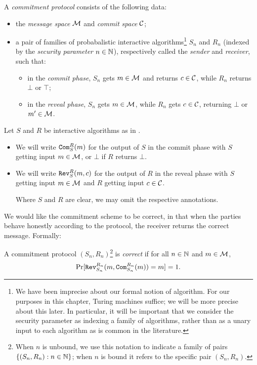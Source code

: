 \begin{dfn}\label{def:commitment protocol}
	A \emph{commitment protocol} consists of the following data:
	\begin{itemize}
		\item the \emph{message space} $\mathcal{M}$ and \emph{commit space} $\mathcal{C}$;
		\item a pair of families of probabalistic interactive algorithms\footnote{We
			      have been imprecise about our formal notion of algorithm. For our
			      purposes in this chapter, Turing machines suffice; we will be more
			      precise about this later. In particular, it will be important that we
			      consider the security parameter as indexing a family of algorithms, rather
			      than as a unary input to each algorithm as is common in the literature.}
		      $S_n$ and $R_n$ (indexed by the
		      \emph{security parameter} $n\in\mathbb{N}$), respectively called the \emph{sender}
		      and \emph{receiver}, such that:
		      \begin{itemize}
			      \item in the \emph{commit phase}, $S_n$ gets $m\in\mathcal{M}$ and returns
			            $c\in\mathcal{C}$, while $R_n$ returns $\bot$ or $\top$;
			      \item in the \emph{reveal phase}, $S_n$ gets $m\in\mathcal{M}$, while $R_n$
			            gets $c\in\mathcal{C}$, returning $\bot$ or $m'\in\mathcal{M}$.
		      \end{itemize}
	\end{itemize}
\end{dfn}

\begin{ntn}
	Let $S$ and $R$ be interactive algorithms as in .\begin{itemize}
		\item	We will write ${\texttt{Com}}_S^R(m)$ for the output of $S$
		      in the commit phase with $S$ getting input $m\in\mathcal{M}$, or $\bot$ if $R$
		      returns $\bot$.
		\item We will write ${\texttt{Rev}}_S^R(m, c)$
		      for the output of $R$ in the reveal phase with $S$ getting input
		      $m\in\mathcal{M}$ and $R$ getting input $c\in\mathcal{C}$.

		      Where $S$ and $R$ are clear, we may omit the respective annotations.
	\end{itemize}
\end{ntn}

\noindent
We would like the commitment scheme to be correct, in that when the parties
behave honestly according to the protocol, the receiver returns the correct
message. Formally:
\begin{dfn}
	A commitment protocol $(S_n,R_n)$\footnote{When $n$ is unbound, we use this
		notation to indicate a family of pairs $\{(S_n,R_n):n\in\mathbb{N}\}$; when $n$ is bound it refers
		to the specific pair $(S_n,R_n)$.} is \emph{correct} if for all $n\in\mathbb{N}$ and
	$m\in\mathcal{M}$, \[
		\Pr[{\texttt{Rev}}_{S_n}^{R_n}(m, {\texttt{Com}}_{S_n}^{R_n}(m)) = m] = 1.
	\]
\end{dfn}

